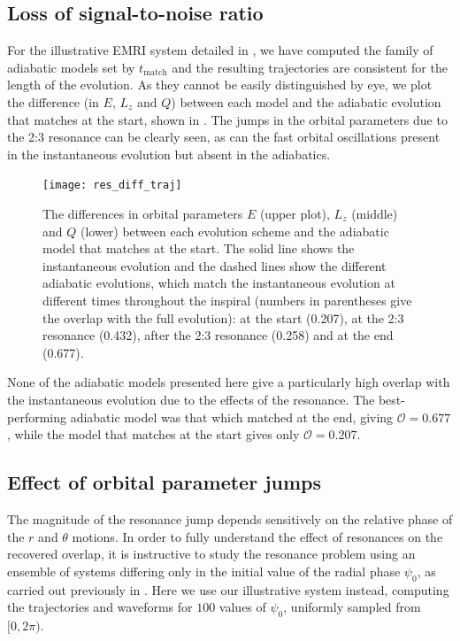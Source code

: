 \subsection{Loss of signal-to-noise ratio}
For the illustrative EMRI system detailed in , we have computed the family of adiabatic models set by $t_{\mathrm{match}}$ and the resulting trajectories are consistent for the length of the evolution. As they cannot be easily distinguished by eye, we plot the difference (in $E$, $L_z$ and $Q$) between each model and the adiabatic evolution that matches at the start, shown in . The jumps in the orbital parameters due to the 2:3 resonance can be clearly seen, as can the fast orbital oscillations present in the instantaneous evolution but absent in the adiabatics.

\begin{figure}[htbp]
\centering
\texttt{[image: res\_diff\_traj]}
\caption{\label{fig:res-diff-traj}The differences in orbital parameters $E$ (upper plot), $L_z$ (middle) and $Q$ (lower) between each evolution scheme and the adiabatic model that matches at the start. The solid line shows the instantaneous evolution and the dashed lines show the different adiabatic evolutions, which match the instantaneous evolution at different times throughout the inspiral (numbers in parentheses give the overlap with the full evolution): at the start (0.207), at the 2:3 resonance (0.432), after the 2:3 resonance (0.258) and at the end (0.677).}
\end{figure}

None of the adiabatic models presented here give a particularly high overlap with the instantaneous evolution due to the effects of the resonance. The best-performing adiabatic model was that which matched at the end, giving $\mathcal{O} = 0.677$, while the model that matches at the start gives only $\mathcal{O} = 0.207$.

\subsection{Effect of orbital parameter jumps}
\label{sec:effres-jumps}
The magnitude of the resonance jump depends sensitively on the relative phase of the $r$ and $\theta$ motions. In order to fully understand the effect of resonances on the recovered overlap, it is instructive to study the resonance problem using an ensemble of systems differing only in the initial value of the radial phase $\psi_0$, as carried out previously in . Here we use our illustrative system instead, computing the trajectories and waveforms for $100$ values of $\psi_0$, uniformly sampled from $[0,2\pi)$.

